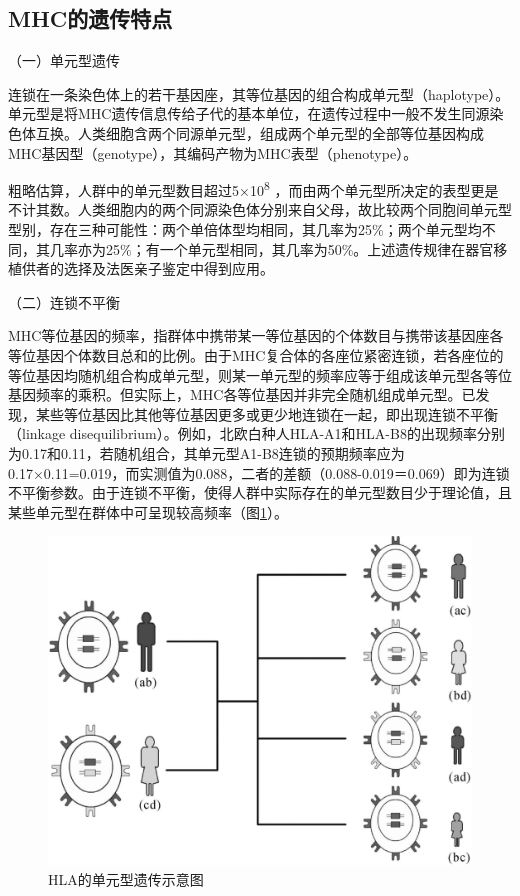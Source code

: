 \subsection{MHC的遗传特点}

（一）单元型遗传

连锁在一条染色体上的若干基因座，其等位基因的组合构成单元型（haplotype）。单元型是将MHC遗传信息传给子代的基本单位，在遗传过程中一般不发生同源染色体互换。人类细胞含两个同源单元型，组成两个单元型的全部等位基因构成MHC基因型（genotype），其编码产物为MHC表型（phenotype）。

粗略估算，人群中的单元型数目超过5×10\textsuperscript{8}
，而由两个单元型所决定的表型更是不计其数。人类细胞内的两个同源染色体分别来自父母，故比较两个同胞间单元型型别，存在三种可能性：两个单倍体型均相同，其几率为25\%；两个单元型均不同，其几率亦为25\%；有一个单元型相同，其几率为50\%。上述遗传规律在器官移植供者的选择及法医亲子鉴定中得到应用。

（二）连锁不平衡

MHC等位基因的频率，指群体中携带某一等位基因的个体数目与携带该基因座各等位基因个体数目总和的比例。由于MHC复合体的各座位紧密连锁，若各座位的等位基因均随机组合构成单元型，则某一单元型的频率应等于组成该单元型各等位基因频率的乘积。但实际上，MHC各等位基因并非完全随机组成单元型。已发现，某些等位基因比其他等位基因更多或更少地连锁在一起，即出现连锁不平衡（linkage
disequilibrium）。例如，北欧白种人HLA-A1和HLA-B8的出现频率分别为0.17和0.11，若随机组合，其单元型A1-B8连锁的预期频率应为0.17×0.11=0.019，而实测值为0.088，二者的差额（0.088-0.019＝0.069）即为连锁不平衡参数。由于连锁不平衡，使得人群中实际存在的单元型数目少于理论值，且某些单元型在群体中可呈现较高频率（图\ref{fig7-4}）。

\begin{figure}[!htbp]
 \centering
 \includegraphics{./images/Image00105.jpg}
 \captionsetup{justification=centering}
 \caption{HLA的单元型遗传示意图}
 \label{fig7-4}
  \end{figure} 

